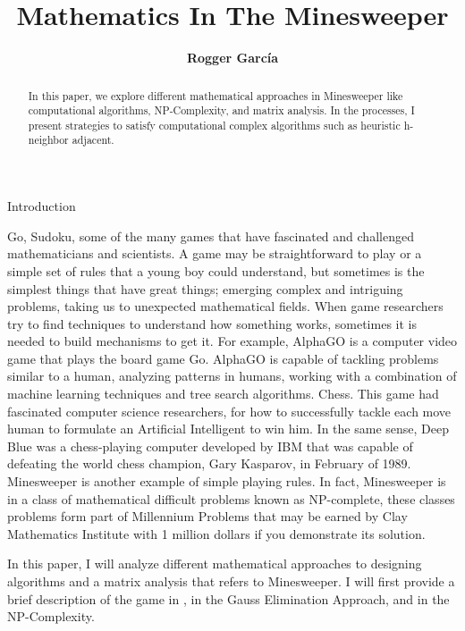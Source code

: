 \documentclass[a4paper]{article}
\title{\textbf{Mathematics In The Minesweeper}}
\author{\textbf{Rogger García}}
\numberwithin{equation}{subsection}
\begin{document}
\maketitle

\begin{abstract}
In this paper, we explore different mathematical approaches in Minesweeper like computational algorithms, NP-Complexity, and matrix analysis. In the processes, I present strategies to satisfy computational complex algorithms such as heuristic h-neighbor adjacent.
\end{abstract}


{\huge Introduction}



\vspace{5mm} %

Go, Sudoku, some of the many games that have fascinated and challenged mathematicians and scientists.  A game may be straightforward to play or a simple set of rules that a young boy could understand, but sometimes is the simplest things that have great things; emerging complex and intriguing problems, taking us to unexpected mathematical fields.
When game researchers try to find techniques to understand how something works, sometimes it is needed to build mechanisms to get it. For example, AlphaGO is a computer video game that plays the board game Go.  AlphaGO is capable of tackling problems similar to a human, analyzing patterns in humans, working with a combination of machine learning techniques and tree search algorithms.
Chess. This game had fascinated computer science researchers, for how to successfully tackle each move human to formulate an Artificial Intelligent to win him. In the same sense, Deep Blue was a chess-playing computer developed by IBM that was capable of defeating the world chess champion, Gary Kasparov, in February of 1989.
Minesweeper is another example of simple playing rules. In fact,  Minesweeper is in a class of mathematical difficult problems known as NP-complete, these classes problems form part of Millennium Problems that may be earned by Clay Mathematics Institute with 1 million dollars if you demonstrate its solution.


\vspace{5mm} %
In this paper, I will analyze different mathematical approaches to designing algorithms and a matrix analysis that refers to Minesweeper. I will first provide a brief description of the game in , in the  Gauss Elimination Approach, and in the    NP-Complexity.
\end{document}
